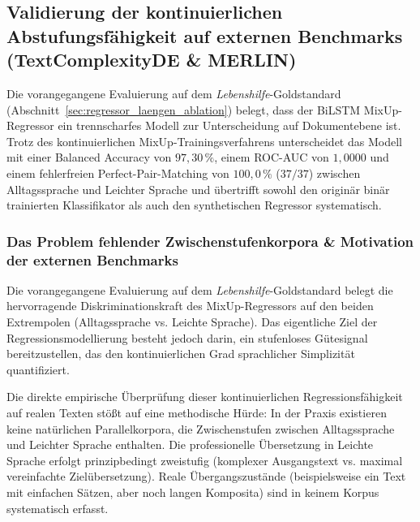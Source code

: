 \subsection{Validierung der kontinuierlichen Abstufungsfähigkeit auf externen Benchmarks (TextComplexityDE \& MERLIN)}
\label{sec:validierung_abstufung_externe_benchmarks}

Die vorangegangene Evaluierung auf dem \textit{Lebenshilfe}-Goldstandard (Abschnitt~\ref{sec:regressor_laengen_ablation}) belegt, dass der BiLSTM MixUp-Regressor ein trennscharfes Modell zur Unterscheidung auf Dokumentebene ist. Trotz des kontinuierlichen MixUp-Trainingsverfahrens unterscheidet das Modell mit einer Balanced Accuracy von $97{,}30\,\%$, einem ROC-AUC von $1{,}0000$ und einem fehlerfreien Perfect-Pair-Matching von $100{,}0\,\%$ ($37/37$) zwischen Alltagssprache und Leichter Sprache und übertrifft sowohl den originär binär trainierten Klassifikator als auch den synthetischen Regressor systematisch.

\subsubsection{Das Problem fehlender Zwischenstufenkorpora \& Motivation der externen Benchmarks}
\label{sec:dilemma_zwischenstufen}

Die vorangegangene Evaluierung auf dem \textit{Lebenshilfe}-Goldstandard belegt die hervorragende Diskriminationskraft des MixUp-Regressors auf den beiden Extrempolen (Alltagssprache vs. Leichte Sprache). Das eigentliche Ziel der Regressionsmodellierung besteht jedoch darin, ein stufenloses Gütesignal bereitzustellen, das den kontinuierlichen Grad sprachlicher Simplizität quantifiziert.

Die direkte empirische Überprüfung dieser kontinuierlichen Regressionsfähigkeit auf realen Texten stößt auf eine methodische Hürde: In der Praxis existieren keine natürlichen Parallelkorpora, die Zwischenstufen zwischen Alltagssprache und Leichter Sprache enthalten. Die professionelle Übersetzung in Leichte Sprache erfolgt prinzipbedingt zweistufig (komplexer Ausgangstext vs. maximal vereinfachte Zielübersetzung). Reale Übergangszustände (beispielsweise ein Text mit einfachen Sätzen, aber noch langen Komposita) sind in keinem Korpus systematisch erfasst.

